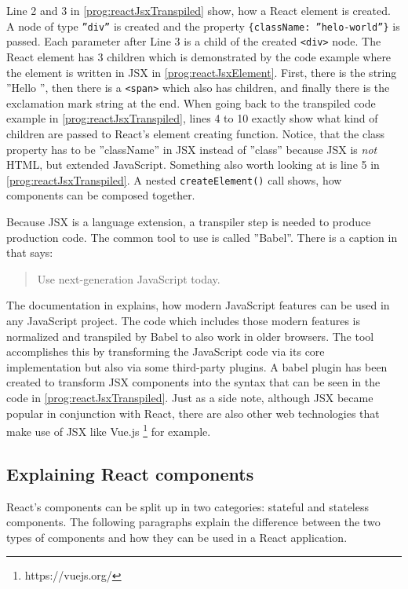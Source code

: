 Line 2 and 3 in \ref{prog:reactJsxTranspiled} show, how a React element is created. A node of type \texttt{''div''} is created and the property \texttt{\{className: ''helo-world''\}} is passed. Each parameter after Line 3 is a child of the created \texttt{<div>} node. The React element has 3 children which is demonstrated by the code example where the element is written in JSX in \ref{prog:reactJsxElement}. First, there is the string ''Hello '', then there is a \texttt{<span>} which also has children, and finally there is the exclamation mark string at the end. When going back to the transpiled code example in \ref{prog:reactJsxTranspiled}, lines 4 to 10 exactly show what kind of children are passed to React's element creating function. Notice, that the class property has to be ''className'' in JSX instead of ''class'' because JSX is \emph{not} HTML, but extended JavaScript. Something also worth looking at is line 5 in \ref{prog:reactJsxTranspiled}. A nested \texttt{createElement()} call shows, how components can be composed together.

Because JSX is a language extension, a transpiler step is needed to produce production code. The common tool to use is called ''Babel''. There is a caption in \cite{Babel} that says: \begin{quote}\begin{english}Use next-generation JavaScript today.\end{english}\end{quote} The documentation in \cite[/docs/en]{Babel} explains, how modern JavaScript features can be used in any JavaScript project. The code which includes those modern features is normalized and transpiled by Babel to also work in older browsers. The tool accomplishes this by transforming the JavaScript code via its core implementation but also via some third-party plugins. A babel plugin has been created to transform JSX components into the syntax that can be seen in the code in \ref{prog:reactJsxTranspiled}. Just as a side note, although JSX became popular in conjunction with React, there are also other web technologies that make use of JSX like Vue.js \footnote{https://vuejs.org/} for example.

\subsection{Explaining React components}
\label{sec:reactComponents}

React's components can be split up in two categories: stateful and stateless components. The following paragraphs explain the difference between the two types of components and how they can be used in a React application.

